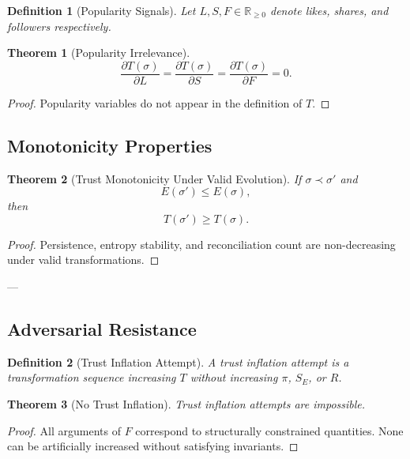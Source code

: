 \documentclass[11pt]{article}
\newtheorem{definition}{Definition}
\newtheorem{theorem}{Theorem}
\begin{document}
\begin{definition}[Popularity Signals]
Let $L,S,F \in \mathbb{R}_{\ge 0}$ denote likes, shares, and followers respectively.
\end{definition}

\begin{theorem}[Popularity Irrelevance]
\[
\frac{\partial T(\sigma)}{\partial L}
=
\frac{\partial T(\sigma)}{\partial S}
=
\frac{\partial T(\sigma)}{\partial F}
=
0.
\]
\end{theorem}

\begin{proof}
Popularity variables do not appear in the definition of $T$.
\end{proof}

\subsection{Monotonicity Properties}

\begin{theorem}[Trust Monotonicity Under Valid Evolution]
If $\sigma \prec \sigma'$ and
\[
E(\sigma') \le E(\sigma),
\]
then
\[
T(\sigma') \ge T(\sigma).
\]
\end{theorem}

\begin{proof}
Persistence, entropy stability, and reconciliation count are non-decreasing under valid
transformations.
\end{proof}

---

\subsection{Adversarial Resistance}

\begin{definition}[Trust Inflation Attempt]
A trust inflation attempt is a transformation sequence increasing $T$ without increasing
$\pi$, $S_E$, or $R$.
\end{definition}

\begin{theorem}[No Trust Inflation]
Trust inflation attempts are impossible.
\end{theorem}

\begin{proof}
All arguments of $F$ correspond to structurally constrained quantities. None can be
artificially increased without satisfying invariants.
\end{proof}
\end{document}
